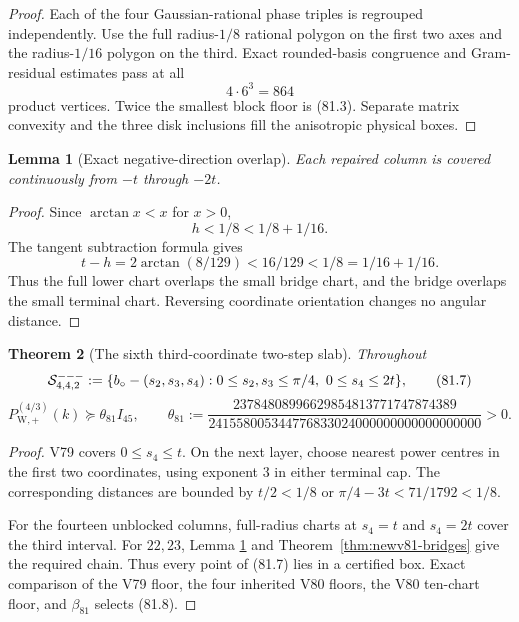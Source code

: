 \documentclass[11pt,oneside]{article}
\newtheorem{theorem}{Theorem}[section]
\newtheorem{lemma}[theorem]{Lemma}
\theoremstyle{definition}
\theoremstyle{remark}
\begin{document}
\begin{proof}
Each of the four Gaussian-rational phase triples is regrouped
independently.  Use the full radius-\(1/8\) rational polygon on the
first two axes and the radius-\(1/16\) polygon on the third.  Exact
rounded-basis congruence and Gram-residual estimates pass at all
\[
 4\cdot6^3=864                                         \tag{81.4}
\]
product vertices.  Twice the smallest block floor is (81.3).
Separate matrix convexity and the three disk inclusions fill the
anisotropic physical boxes.
\end{proof}

\begin{lemma}[Exact negative-direction overlap]
\label{lem:newv81-overlap}
Each repaired column is covered continuously from \(-t\) through
\(-2t\).
\end{lemma}

\begin{proof}
Since \(\arctan x<x\) for \(x>0\),
\[
 h<1/8<1/8+1/16.                                      \tag{81.5}
\]
The tangent subtraction formula gives
\[
 t-h=2\arctan(8/129)<16/129<1/8=1/16+1/16.            \tag{81.6}
\]
Thus the full lower chart overlaps the small bridge chart, and the
bridge overlaps the small terminal chart.  Reversing coordinate
orientation changes no angular distance.
\end{proof}

\begin{theorem}[The sixth third-coordinate two-step slab]
\label{thm:newv81-two-step-slab}
Throughout
\[
 {\cal S}^{---}_{4,4,2}:=
 \{b_\circ-(s_2,s_3,s_4):
 0\le s_2,s_3\le\pi/4,\ 0\le s_4\le2t\},              \tag{81.7}
\]
\[
 P_{\mathrm W,+}^{(4/3)}(k)
 \succeq\theta_{81}I_{45},\qquad
 \theta_{81}:=
 \frac{23784808996629854813771747874389}
 {241558005344776833024000000000000000000}>0.          \tag{81.8}
\]
\end{theorem}

\begin{proof}
V79 covers \(0\le s_4\le t\).  On the next layer, choose nearest
power centres in the first two coordinates, using exponent \(3\) in
either terminal cap.  The corresponding distances are bounded by
\(t/2<1/8\) or \(\pi/4-3t<71/1792<1/8\).

For the fourteen unblocked columns, full-radius charts at \(s_4=t\)
and \(s_4=2t\) cover the third interval.  For \(22,23\), Lemma
\ref{lem:newv81-overlap} and Theorem~\ref{thm:newv81-bridges} give
the required chain.  Thus every point of (81.7) lies in a certified
box.  Exact comparison of the V79 floor, the four inherited V80
floors, the V80 ten-chart floor, and \(\beta_{81}\) selects (81.8).
\end{proof}
\end{document}
